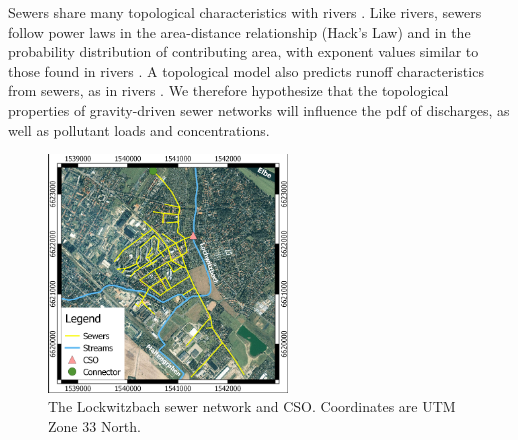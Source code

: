 \documentclass[draft,linenumbers]{agujournal2018}
\begin{document}
Sewers share many topological characteristics with rivers \citep{Yang_2017}. Like rivers, sewers follow power laws in the area-distance relationship (Hack’s Law) and in the probability distribution of contributing area, with exponent values similar to those found in rivers \citep{Yang_2017}. A topological model also predicts runof\/f characteristics from sewers, as in rivers \citep{LHOMME_2004}. We therefore hypothesize that the topological properties of gravity-driven sewer networks will inf\/luence the pdf of discharges, as well as pollutant loads and concentrations.


\begin{figure}[h]
 \centering
\includegraphics[width=15pc]{Fig2.pdf}
 \caption{The Lockwitzbach sewer network and CSO. Coordinates are UTM Zone 33 North.}
 \label{figtwo}
  \end{figure}
\end{document}
